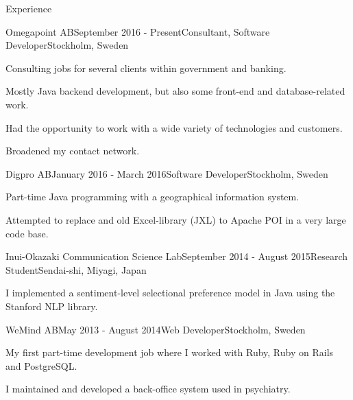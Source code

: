 \documentclass{resume} %
\begin{document}
\begin{rSection}{Experience}

\begin{rSubsection}{Omegapoint AB}{September 2016 - Present}{Consultant, Software Developer}{Stockholm, Sweden}
\item Consulting jobs for several clients within government and banking. 
\item Mostly Java backend development, but also some front-end and database-related work.
\item Had the opportunity to work with a wide variety of technologies and customers.
\item Broadened my contact network.
\end{rSubsection}


\begin{rSubsection}{Digpro AB}{January 2016 - March 2016}{Software Developer}{Stockholm, Sweden}
\item Part-time Java programming with a geographical information system.
\item Attempted to replace and old Excel-library (JXL) to Apache POI in a very large code base.
\end{rSubsection}


\begin{rSubsection}{Inui-Okazaki Communication Science Lab}{September 2014 - August 2015}{Research Student}{Sendai-shi, Miyagi, Japan}
\item I implemented a sentiment-level selectional preference model in Java using the Stanford NLP library.
\end{rSubsection}


\begin{rSubsection}{WeMind AB}{May 2013 - August 2014}{Web Developer}{Stockholm, Sweden}
\item My first part-time development job where I worked with Ruby, Ruby on Rails and PostgreSQL.
\item I maintained and developed a back-office system used in psychiatry.
\end{rSubsection}

\end{rSection}

\end{document}
